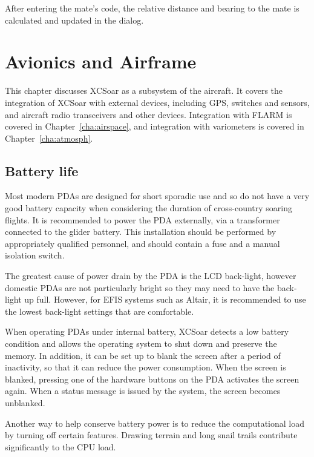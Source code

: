 \documentclass[a4paper,12pt]{refrep}
\begin{document}
  After entering the mate's code, the relative distance and
  bearing to the mate is calculated and updated in the dialog.



\chapter{Avionics and Airframe}\label{cha:avionics-airframe}

This chapter discusses XCSoar as a subsystem of the aircraft.  It
covers the integration of XCSoar with external devices, including GPS,
switches and sensors, and aircraft radio transceivers and other
devices.  Integration with FLARM is covered in
Chapter~\ref{cha:airspace}, and integration with variometers is
covered in Chapter~\ref{cha:atmosph}.

\section{Battery life}

Most modern PDAs are designed for short sporadic use and so do not
have a very good battery capacity when considering the duration of
cross-country soaring flights.  It is recommended to power the PDA
externally, via a transformer connected to the glider battery.  This
installation should be performed by appropriately qualified personnel,
and should contain a fuse and a manual isolation switch.

The greatest cause of power drain by the PDA is the LCD back-light,
however domestic PDAs are not particularly bright so they may need to
have the back-light up full. However, for EFIS systems such as Altair,
it is recommended to use the lowest back-light settings that are
comfortable.

When operating PDAs under internal battery, XCSoar detects a low
battery condition and allows the operating system to shut down and
preserve the memory.  In addition, it can be set up to blank the
screen after a period of inactivity, so that it can reduce the power
consumption.  When the screen is blanked, pressing one of the hardware
buttons on the PDA activates the screen again.  When a status message
is issued by the system, the screen becomes unblanked.

Another way to help conserve battery power is to reduce the
computational load by turning off certain features.  Drawing terrain
and long snail trails contribute significantly to the CPU load.
\end{document}
